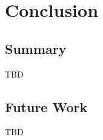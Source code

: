 
\chapter{Conclusion}
\label{chap:conc}

\section{Summary}
\label{sec:summary}


TBD


\section{Future Work}
\label{sec:future}

TBD



